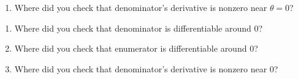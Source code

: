\documentclass[10pt]{article} %
\begin{document}
\begin{enumerate}
	\item Where did you check that denominator's derivative is nonzero near $\theta=0$?
\end{enumerate}
\begin{enumerate}
	\item 
		Where did you check that denominator is differentiable around 0?
	\item 
		Where did you check that  enumerator is differentiable around 0?
	\item Where did you check that denominator's derivative is nonzero near 0?
\end{enumerate}
\end{document}
